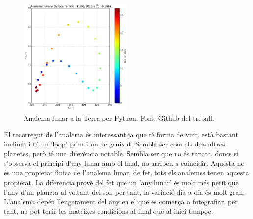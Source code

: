 \documentclass[a4paper, 11pt]{article}
\begin{document}
\begin{figure}[h!]
    \centering
    \includegraphics[width=0.50\textwidth]{images/analema_lluna.png}
    \caption{Analema lunar a la Terra per Python. Font: Github del treball.}
    \label{fig:lluna}
\end{figure}
\vspace{2mm}

\noindent El recorregut de l'analema és interessant ja que té forma de vuit, està bastant inclinat i té un 'loop' prim i un de gruixut. Sembla ser com els dels altres planetes, però té una diferència notable. Sembla ser que no és tancat, doncs si s'observa el principi d'any lunar amb el final, no arriben a coincidir. Aquesta no és una propietat única de l'analema lunar, de fet, tots els analemes tenen aquesta propietat. La diferencia prové del fet que un 'any lunar' és molt més petit que l'any d'un planeta al voltant del sol, per tant, la variació día a dia és molt gran. L'analema depén lleugerament del any en el que es comença a fotografiar, per tant, no pot tenir les mateixes condicions al final que al inici tampoc.




\newpage
\printbibliography
\end{document}
